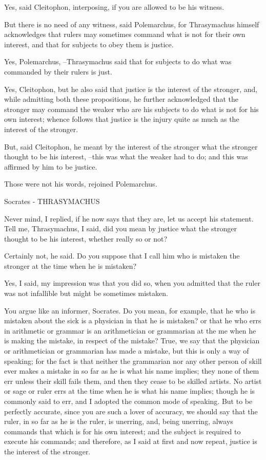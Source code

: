 Yes, said Cleitophon, interposing, if you are allowed to be his witness.

But there is no need of any witness, said Polemarchus, for Thrasymachus himself acknowledges that rulers may sometimes command what is not for their own interest, and that for subjects to obey them is justice.

Yes, Polemarchus, --Thrasymachus said that for subjects to do what was commanded by their rulers is just.

Yes, Cleitophon, but he also said that justice is the interest of the stronger, and, while admitting both these propositions, he further acknowledged that the stronger may command the weaker who are his subjects to do what is not for his own interest; whence follows that justice is the injury quite as much as the interest of the stronger.

But, said Cleitophon, he meant by the interest of the stronger what the stronger thought to be his interest, --this was what the weaker had to do; and this was affirmed by him to be justice.

Those were not his words, rejoined Polemarchus.

Socrates - THRASYMACHUS

Never mind, I replied, if he now says that they are, let us accept his statement. Tell me, Thrasymachus, I said, did you mean by justice what the stronger thought to be his interest, whether really so or not?

Certainly not, he said. Do you suppose that I call him who is mistaken the stronger at the time when he is mistaken?

Yes, I said, my impression was that you did so, when you admitted that the ruler was not infallible but might be sometimes mistaken.

You argue like an informer, Socrates. Do you mean, for example, that he who is mistaken about the sick is a physician in that he is mistaken? or that he who errs in arithmetic or grammar is an arithmetician or grammarian at the me when he is making the mistake, in respect of the mistake? True, we say that the physician or arithmetician or grammarian has made a mistake, but this is only a way of speaking; for the fact is that neither the grammarian nor any other person of skill ever makes a mistake in so far as he is what his name implies; they none of them err unless their skill fails them, and then they cease to be skilled artists. No artist or sage or ruler errs at the time when he is what his name implies; though he is commonly said to err, and I adopted the common mode of speaking. But to be perfectly accurate, since you are such a lover of accuracy, we should say that the ruler, in so far as he is the ruler, is unerring, and, being unerring, always commands that which is for his own interest; and the subject is required to execute his commands; and therefore, as I said at first and now repeat, justice is the interest of the stronger.

